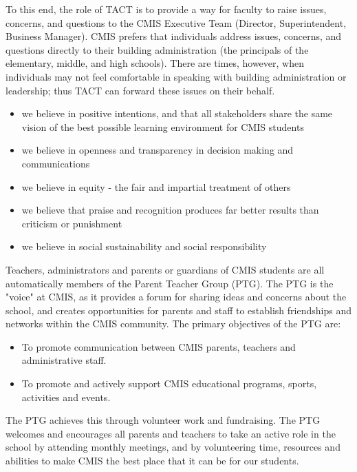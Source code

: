 To this end, the role of TACT is to provide a way for faculty to raise issues, concerns, and questions to the CMIS Executive Team (Director, Superintendent, Business Manager).  CMIS prefers that individuals address issues, concerns, and questions directly to their building administration (the principals of the elementary, middle, and high schools).  There are times, however, when individuals may not feel comfortable in speaking with building administration or leadership; thus TACT can forward these issues on their behalf.

\begin{itemize}
\item we believe in positive intentions, and that all stakeholders share the same vision of the best possible learning environment for CMIS students
\item we believe in openness and transparency in decision making and communications
\item we believe in equity - the fair and impartial treatment of others
\item we believe that praise and recognition produces far better results than criticism or punishment
\item we believe in social sustainability and social responsibility
\end{itemize}


Teachers, administrators and parents or guardians of CMIS students are all automatically members of the Parent Teacher Group (PTG). The PTG is the "voice" at CMIS, as it provides a forum for sharing ideas and concerns about the school, and creates opportunities for parents and staff to establish friendships and networks within the CMIS community. The primary objectives of the PTG are:

\begin{itemize}
\item To promote communication between CMIS parents, teachers and administrative staff.
\item To promote and actively support CMIS educational programs, sports, activities and events.
\end{itemize}
 
The PTG achieves this through volunteer work and fundraising.  The PTG welcomes and encourages all parents and teachers to take an active role in the school by attending monthly meetings, and by volunteering time, resources and abilities to make CMIS the best place that it can be for our students.

